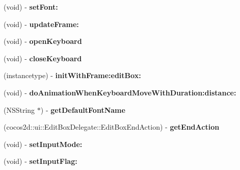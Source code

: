 \begin{DoxyCompactItemize}
\item 
\mbox{\label{interfaceUIEditBoxImplIOS__objc_ad705593f5929f363b720cef9f37e3e42}} 
(void) -\/ {\bfseries set\+Font\+:}
\item 
\mbox{\label{interfaceUIEditBoxImplIOS__objc_aa6937f05827d11894094863ece8676e9}} 
(void) -\/ {\bfseries update\+Frame\+:}
\item 
\mbox{\label{interfaceUIEditBoxImplIOS__objc_a519cd8ac103d7a7b30e565b11c00f0d5}} 
(void) -\/ {\bfseries open\+Keyboard}
\item 
\mbox{\label{interfaceUIEditBoxImplIOS__objc_ab75f036557205d27dce028a6c179538f}} 
(void) -\/ {\bfseries close\+Keyboard}
\item 
\mbox{\label{interfaceUIEditBoxImplIOS__objc_aae03a92d130e92f575b0c9dc5fe69a7a}} 
(instancetype) -\/ {\bfseries init\+With\+Frame\+:edit\+Box\+:}
\item 
\mbox{\label{interfaceUIEditBoxImplIOS__objc_a7a8feac60910e1d262d530f0b130c7b0}} 
(void) -\/ {\bfseries do\+Animation\+When\+Keyboard\+Move\+With\+Duration\+:distance\+:}
\item 
\mbox{\label{interfaceUIEditBoxImplIOS__objc_ae4b2680bba0c6e5b3c576fda1afd7a42}} 
(N\+S\+String $\ast$) -\/ {\bfseries get\+Default\+Font\+Name}
\item 
\mbox{\label{interfaceUIEditBoxImplIOS__objc_a3b27832d47c4765a1742373379271621}} 
(cocos2d\+::ui\+::\+Edit\+Box\+Delegate\+::\+Edit\+Box\+End\+Action) -\/ {\bfseries get\+End\+Action}
\item 
\mbox{\label{interfaceUIEditBoxImplIOS__objc_a1d9fee7a9c20659040d5e3a09b3c1496}} 
(void) -\/ {\bfseries set\+Input\+Mode\+:}
\item 
\mbox{\label{interfaceUIEditBoxImplIOS__objc_a0e2f54e033029c396302d692f0b96874}} 
(void) -\/ {\bfseries set\+Input\+Flag\+:}

\end{DoxyCompactItemize}
